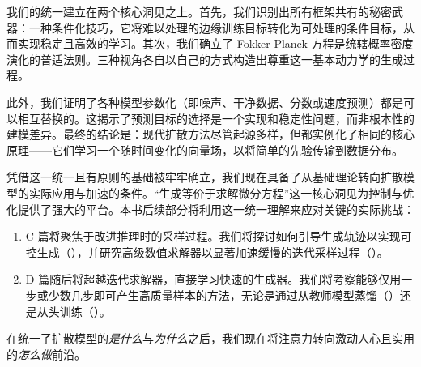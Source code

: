 我们的统一建立在两个核心洞见之上。首先，我们识别出所有框架共有的秘密武器：一种条件化技巧，它将难以处理的边缘训练目标转化为可处理的条件目标，从而实现稳定且高效的学习。其次，我们确立了 Fokker-Planck 方程是统辖概率密度演化的普适法则。三种视角各自以自己的方式构造出尊重这一基本动力学的生成过程。


此外，我们证明了各种模型参数化（即噪声、干净数据、分数或速度预测）都是可以相互替换的。这揭示了预测目标的选择是一个实现和稳定性问题，而非根本性的建模差异。最终的结论是：现代扩散方法尽管起源多样，但都实例化了相同的核心原理——它们学习一个随时间变化的向量场，以将简单的先验传输到数据分布。


凭借这一统一且有原则的基础被牢牢确立，我们现在具备了从基础理论转向扩散模型的实际应用与加速的条件。“生成等价于求解微分方程”这一核心洞见为控制与优化提供了强大的平台。本书后续部分将利用这一统一理解来应对关键的实际挑战：
\begin{enumerate}
    \item C 篇将聚焦于改进推理时的采样过程。我们将探讨如何引导生成轨迹以实现可控生成（），并研究高级数值求解器以显著加速缓慢的迭代采样过程（）。
    \item D 篇随后将超越迭代求解器，直接学习快速的生成器。我们将考察能够仅用一步或少数几步即可产生高质量样本的方法，无论是通过从教师模型蒸馏（）还是从头训练（）。
\end{enumerate}

在统一了扩散模型的\textit{是什么}与\textit{为什么}之后，我们现在将注意力转向激动人心且实用的\textit{怎么做}前沿。
